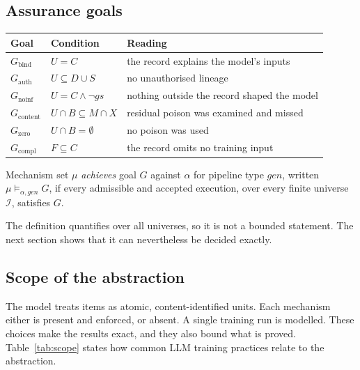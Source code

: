 \subsection{Assurance goals}

\begin{center}\small
\begin{tabular}{@{}llp{3.3cm}@{}}
\toprule
Goal & Condition & Reading\\
\midrule
$G_{\mathrm{bind}}$ & $U=C$ & the record explains the model's inputs\\
$G_{\mathrm{auth}}$ & $U\subseteq D\cup S$ & no unauthorised lineage\\
$G_{\mathrm{noinf}}$ & $U=C\wedge\neg\mathit{gs}$ & nothing outside the record shaped the model\\
$G_{\mathrm{content}}$ & $U\cap B\subseteq M\cap X$ & residual poison was examined and missed\\
$G_{\mathrm{zero}}$ & $U\cap B=\emptyset$ & no poison was used\\
$G_{\mathrm{compl}}$ & $F\subseteq C$ & the record omits no training input\\
\bottomrule
\end{tabular}
\end{center}

\begin{definition}[Assurance]
Mechanism set $\mu$ \emph{achieves} goal $G$ against $\alpha$ for pipeline type
$\mathit{gen}$, written $\mu\models_{\alpha,\mathit{gen}}G$, if every admissible and accepted
execution, over every finite universe $\mathcal{I}$, satisfies $G$.
\end{definition}

The definition quantifies over all universes, so it is not a bounded statement. The next
section shows that it can nevertheless be decided exactly.

\subsection{Scope of the abstraction}\label{sec:scope}

The model treats items as atomic, content-identified units. Each mechanism either is present
and enforced, or absent. A single training run is modelled. These choices make the results
exact, and they also bound what is proved. Table~\ref{tab:scope} states how common LLM
training practices relate to the abstraction.

